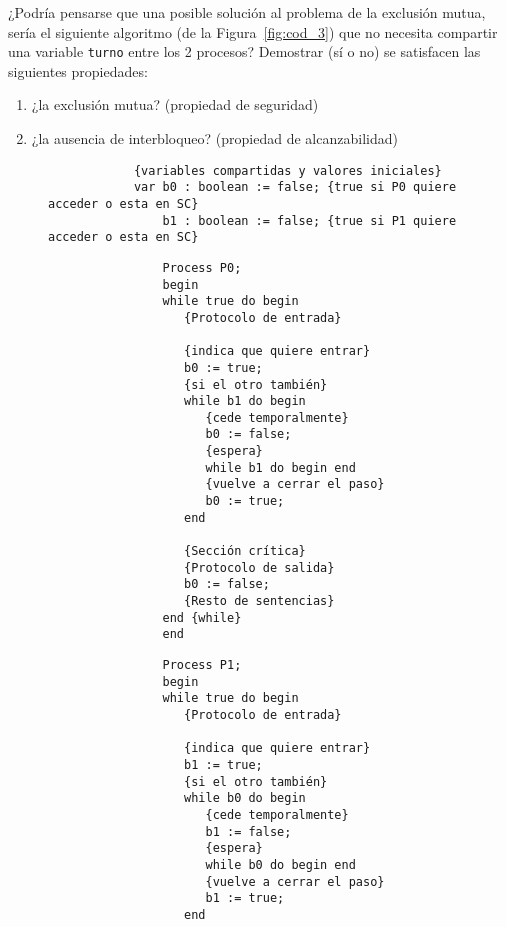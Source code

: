 \begin{ejercicio}\label{ej:2.3}
    ¿Podría pensarse que una posible solución al problema de la exclusión mutua, sería el siguiente algoritmo (de la Figura~\ref{fig:cod_3}) que no necesita compartir una variable \verb|turno| entre los 2 procesos? Demostrar (sí o no) se satisfacen las siguientes propiedades:
    \begin{enumerate}[label=(\alph*)]
        \item ¿la exclusión mutua? (propiedad de seguridad)
        \item ¿la ausencia de interbloqueo? (propiedad de alcanzabilidad)
    \end{enumerate}

    \begin{figure}
        \centering
        \begin{verbatim}
            {variables compartidas y valores iniciales}
            var b0 : boolean := false; {true si P0 quiere acceder o esta en SC}
                b1 : boolean := false; {true si P1 quiere acceder o esta en SC}
        \end{verbatim}
        \setlength{\columnsep}{1cm}
        \begin{multicols}{2}
            \begin{verbatim}
                Process P0;
                begin
                while true do begin
                   {Protocolo de entrada}

                   {indica que quiere entrar}
                   b0 := true;
                   {si el otro también}
                   while b1 do begin
                      {cede temporalmente}
                      b0 := false;
                      {espera}
                      while b1 do begin end
                      {vuelve a cerrar el paso}
                      b0 := true;
                   end

                   {Sección crítica}
                   {Protocolo de salida}
                   b0 := false;
                   {Resto de sentencias}
                end {while}
                end
            \end{verbatim}
            \begin{verbatim}
                Process P1;
                begin
                while true do begin
                   {Protocolo de entrada}

                   {indica que quiere entrar}
                   b1 := true;
                   {si el otro también}
                   while b0 do begin
                      {cede temporalmente}
                      b1 := false;
                      {espera}
                      while b0 do begin end
                      {vuelve a cerrar el paso}
                      b1 := true;
                   end


\end{verbatim}
\end{multicols}
\end{figure}
\end{ejercicio}
